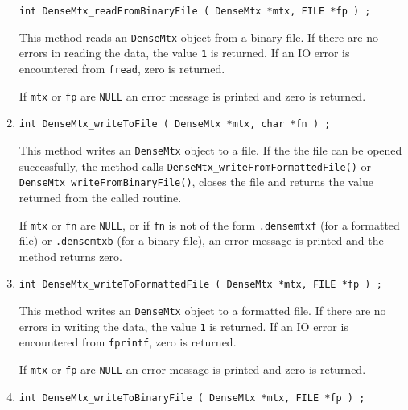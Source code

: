 \begin{enumerate}
\begin{verbatim}
int DenseMtx_readFromBinaryFile ( DenseMtx *mtx, FILE *fp ) ;
\end{verbatim}
\par
This method reads an {\tt DenseMtx} object from a binary file.
If there are no errors in reading the data,
the value {\tt 1} is returned.
If an IO error is encountered from {\tt fread}, zero is returned.
\par {}
If {\tt mtx} or {\tt fp} are {\tt NULL} an error message
is printed and zero is returned.
\item
\begin{verbatim}
int DenseMtx_writeToFile ( DenseMtx *mtx, char *fn ) ;
\end{verbatim}
\par
This method writes an {\tt DenseMtx} object to a file.
If the the file can be opened successfully,
the method calls {\tt DenseMtx\_writeFromFormattedFile()} or
{\tt DenseMtx\_writeFromBinaryFile()},
closes the file
and returns the value returned from the called routine.
\par {}
If {\tt mtx} or {\tt fn} are {\tt NULL},
or if {\tt fn} is not of the form
{\tt *.densemtxf} (for a formatted file)
or {\tt *.densemtxb} (for a binary file),
an error message is printed and the method returns zero.
\item
\begin{verbatim}
int DenseMtx_writeToFormattedFile ( DenseMtx *mtx, FILE *fp ) ;
\end{verbatim}
\par
This method writes an {\tt DenseMtx} object to a formatted file.
If there are no errors in writing the data,
the value {\tt 1} is returned.
If an IO error is encountered from {\tt fprintf}, zero is returned.
\par {}
If {\tt mtx} or {\tt fp} are {\tt NULL} an error message is printed and
zero is returned.
\item
\begin{verbatim}
int DenseMtx_writeToBinaryFile ( DenseMtx *mtx, FILE *fp ) ;
\end{verbatim}

\end{enumerate}
